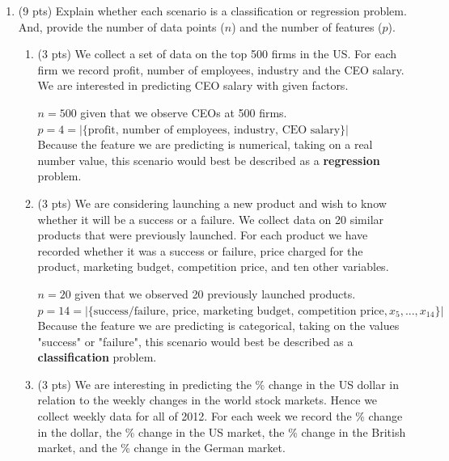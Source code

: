 \documentclass[a4paper]{article}
\theoremstyle{definition}
\newenvironment{soln}{
    \leavevmode\color{blue}\ignorespaces
}{}
\begin{document}
\begin{enumerate}
\item (9 pts) Explain whether each scenario is a classification or regression problem. And, provide the number of data points ($n$) and the number of features ($p$).

\begin{enumerate}
	\item (3 pts) We collect a set of data on the top 500 firms in the US. For each firm we record profit, number of employees, industry and the CEO salary. We are interested in predicting CEO salary with given factors.
	
	\begin{soln}  
            $n = 500$ given that we observe CEOs at 500 firms.
            \\ $p = 4 = |\{ \text{profit, number of employees, industry, CEO salary}\}|$
            \\ Because the feature we are predicting is numerical, taking on a real number value, this scenario would best be described as a \textbf{regression} problem.
        \end{soln}
	
	\item (3 pts) We are considering launching a new product and wish to know whether it will be a success or a failure. We collect data on 20 similar products that were previously launched. For each product we have recorded whether it was a success or failure, price charged for the product, marketing budget, competition price, and ten other variables.
	
	\begin{soln}  
            $n = 20$ given that we observed 20 previously launched products.
            \\ $p = 14 = |\{ \text{success/failure, price, marketing budget, competition price}, x_{5}, ... , x_{14} \}|$
            \\ Because the feature we are predicting is categorical, taking on the values "success" or "failure", this scenario would best be described as a \textbf{classification} problem.
        \end{soln}
	
	\item (3 pts) We are interesting in predicting the \% change in the US dollar in relation to the weekly changes in the world stock markets. Hence we collect weekly data for all of 2012. For each week we record the \% change in the dollar, the \% change in the US market, the \% change in the British market, and the \% change in the German market.
	

\end{enumerate}
\end{enumerate}
\end{document}
